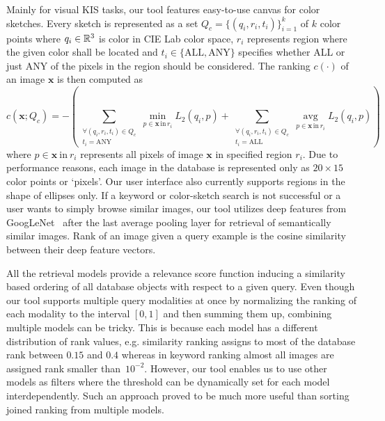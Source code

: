 Mainly for visual KIS tasks, our tool features easy-to-use canvas for color sketches. Every sketch is represented as a set $Q_c = \{\left(q_i, r_i, t_i\right)\}^k_{i=1}$ of $k$ color points where $q_i\in\mathbb{R}^3$ is color in CIE Lab color space, $r_i$ represents region where the given color shall be located and $t_i\in \{\mathrm{ALL},\mathrm{ANY}\}$ specifies whether ALL or just ANY of the pixels in the region should be considered. The ranking $c(\cdot)$ of an image $\bm{x}$ is then computed as
\begin{equation}
c\left(\bm{x}; Q_c\right) =-\left(\sum\limits_{\substack{\forall \left(q_i,r_i,t_i\right) \in Q_c\\t_i=\mathrm{ANY}}} \min\limits_{p\in\bm{x}\,\mathrm{in}\,r_i}L_2\left(q_i, p\right)+\sum\limits_{\substack{\forall \left(q_i,r_i,t_i\right) \in Q_c\\t_i=\mathrm{ALL}}} \mathop{\mathrm{avg}}\limits_{p\in\bm{x}\,\mathrm{in}\,r_i}L_2\left(q_i, p\right)\right)
\end{equation}
where $p\in\bm{x}\ \mathrm{in}\ r_i$ represents all pixels of image $\bm{x}$ in specified region $r_i$. Due to performance reasons, each image in the database is represented only as $20\times 15$ color points or `pixels'. Our user interface also currently supports regions in the shape of ellipses only. If a keyword or color-sketch search is not successful or a user wants to simply browse similar images, our tool utilizes deep features from GoogLeNet~\cite{szegedy2015going} after the last average pooling layer for retrieval of semantically similar images. Rank of an image given a query example is the cosine similarity between their deep feature vectors.


All the retrieval models provide a relevance score function inducing a similarity based ordering of all database objects with respect to a given query. Even though our tool supports multiple query modalities at once by normalizing the ranking of each modality to the interval $[0, 1]$ and then summing them up, combining multiple models can be tricky. This is because each model has a different distribution of rank values, e.g. similarity ranking assigns to most of the database rank between $0.15$ and $0.4$ whereas in keyword ranking almost all images are assigned rank smaller than~$10^{-2}$. However, our tool enables us to use other models as filters where the threshold can be dynamically set for each model interdependently. Such an approach proved to be much more useful than sorting joined ranking from multiple models.

